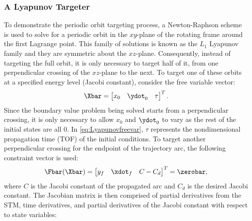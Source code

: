 \subsubsection{A Lyapunov Targeter}
To demonstrate the periodic orbit targeting process, a Newton-Raphson scheme is used to solve for a
periodic orbit in the $xy$-plane of the rotating frame around the first Lagrange point. This family
of solutions is known as the $L_{1}$ Lyapunov family and they are symmetric about the $xz$-plane.
Consequently, instead of targeting the full orbit, it is only necessary to target half of it, from
one perpendicular crossing of the $xz$-plane to the next. To target one of these orbits at a
specified energy level (Jacobi constant), consider the free variable vector:
\begin{equation}
    \Xbar=\begin{bmatrix}   x_{0}   &   \ydot_{0}   &   \tau    \end{bmatrix}^{T}.
    \label{eq:Lyapunovfreevar}
\end{equation}
Since the boundary value problem being solved starts from a perpendicular crossing, it is only
necessary to allow $x_{0}$ and $\ydot_{0}$ to vary as the rest of the initial states are all $0$.
In \cref{eq:Lyapunovfreevar}, $\tau$ represents the nondimensional propagation time (TOF) of the
initial conditions. To target another perpendicular crossing for the endpoint of the trajectory
arc, the following constraint vector is used:
\begin{equation}
    \Fbar(\Xbar)=\begin{bmatrix}    y_{f}   &   \xdot_{f}   &   C-C_{d} \end{bmatrix}^{T}=\zerobar,
    \label{eq:Lyapunovconst}
\end{equation}
where $C$ is the Jacobi constant of the propagated arc and $C_{d}$ is the desired Jacobi constant.
The Jacobian matrix is then comprised of partial derivatives from the STM, time derivatives, and
partial derivatives of the Jacobi constant with respect to state variables:
